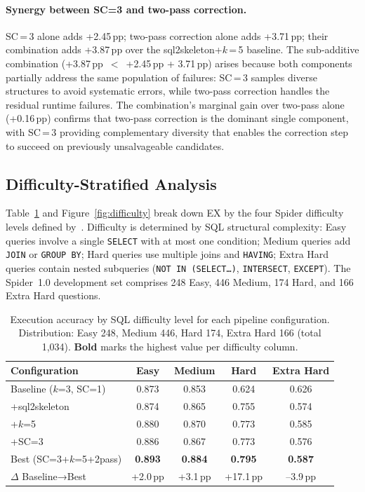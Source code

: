 \paragraph{Synergy between SC=3 and two-pass correction.}
SC\,=\,3 alone adds +2.45\,pp; two-pass correction alone adds +3.71\,pp;
their combination adds +3.87\,pp over the sql2skeleton+$k$\,=\,5 baseline.
The sub-additive combination (+3.87\,pp~$<$~+2.45\,pp + 3.71\,pp)
arises because both components partially address the same population of
failures: SC\,=\,3 samples diverse structures to avoid systematic
errors, while two-pass correction handles the residual runtime failures.
The combination's marginal gain over two-pass alone (+0.16\,pp) confirms
that two-pass correction is the dominant single component, with SC\,=\,3
providing complementary diversity that enables the correction step to
succeed on previously unsalvageable candidates.

\subsection{Difficulty-Stratified Analysis}
\label{sec:exp_difficulty}

Table~\ref{tab:difficulty} and Figure~\ref{fig:difficulty} break down
EX by the four Spider difficulty levels defined by~\citet{yu2018spider}.
Difficulty is determined by SQL structural complexity: Easy queries
involve a single \texttt{SELECT} with at most one condition; Medium
queries add \texttt{JOIN} or \texttt{GROUP BY}; Hard queries use
multiple joins and \texttt{HAVING}; Extra Hard queries contain nested
subqueries (\texttt{NOT IN (SELECT\ldots)}, \texttt{INTERSECT},
\texttt{EXCEPT}).
The Spider~1.0 development set comprises 248 Easy, 446 Medium, 174 Hard,
and 166 Extra Hard questions.

\begin{table}[!tbp]
  \centering
  \caption[EX by Spider difficulty level per pipeline configuration]{
    Execution accuracy by SQL difficulty level for each pipeline configuration.
    Distribution: Easy 248, Medium 446, Hard 174, Extra Hard 166
    (total 1{,}034).
    \textbf{Bold} marks the highest value per difficulty column.}
  \label{tab:difficulty}
  \begin{tabular}{lcccc}
    \toprule
    Configuration & Easy & Medium & Hard & Extra Hard \\
    \midrule
    Baseline ($k$=3, SC=1)      & 0.873 & 0.853 & 0.624 & 0.626 \\
    +sql2skeleton               & 0.874 & 0.865 & 0.755 & 0.574 \\
    +$k$=5                      & 0.880 & 0.870 & 0.773 & 0.585 \\
    +SC=3                       & 0.886 & 0.867 & 0.773 & 0.576 \\
    Best (SC=3+$k$=5+2pass)     & \textbf{0.893} & \textbf{0.884} & \textbf{0.795} & \textbf{0.587} \\
    \midrule
    $\Delta$ Baseline→Best      & +2.0\,pp & +3.1\,pp & +17.1\,pp & --3.9\,pp \\
    \bottomrule
  \end{tabular}
\end{table}

